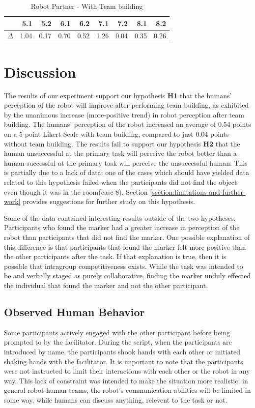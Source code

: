 \documentclass{acm_proc_article-sp}
\begin{document}
\begin{table}
\centering
\caption{Robot Partner - With Team building}
\begin{tabular}{|r|r|r|r|r|r|r|r|r|} \hline
&5.1&5.2&6.1&6.2&7.1&7.2&8.1&8.2 \\ \hline
$\Delta$&1.04&0.17&0.70&0.52&1.26&0.04&0.35&0.26 \\ \hline
\end{tabular}
\label{table:RT}
\end{table}


\section{Discussion}
\label{section:discussion}
The results of our experiment support our hypothesis \textbf{H1} that the humans' perception of the robot will improve after performing team building, as exhibited by the unanimous increase (more-positive trend) in robot perception after team building. The humans' perception of the robot increased an average of 0.54 points on a 5-point Likert Scale with team building, compared to just 0.04 points without team building.
The results fail to support our hypothesis \textbf{H2} that the human unsuccessful at the primary task will perceive the robot better than a human successful at the primary task will perceive the unsuccessful human. This is partially due to a lack of data: one of the cases which should have yielded data related to this hypothesis failed when the participants did not find the object even though it was in the room(case 8). Section \ref{section:limitations-and-further-work} provides suggestions for further study on this hypothesis.

Some of the data contained interesting results outside of the two hypotheses. Participants who found the marker had a greater increase in perception of the robot than participants that did not find the marker. One possible explanation of this difference is that participants that found the marker felt more positive than the other participants after the task. If that explanation is true, then it is possible that intragroup competitiveness exists. While the task was intended to be and verbally staged as purely collaborative, finding the marker unduly effected the individual that found the marker and not the other participant.

\subsection{Observed Human Behavior}
\label{subsection:observed-human-human-behavior}
Some participants actively engaged with the other participant before being prompted to by the facilitator. During the script, when the participants are introduced by name, the participants shook hands with each other or initiated shaking hands with the facilitator. It is important to note that the participants were not instructed to limit their interactions with each other or the robot in any way. This lack of constraint was intended to make the situation more realistic; in general robot-human teams, the robot's communication abilities will be limited in some way, while humans can discuss anything, relevent to the task or not. 
\end{document}
